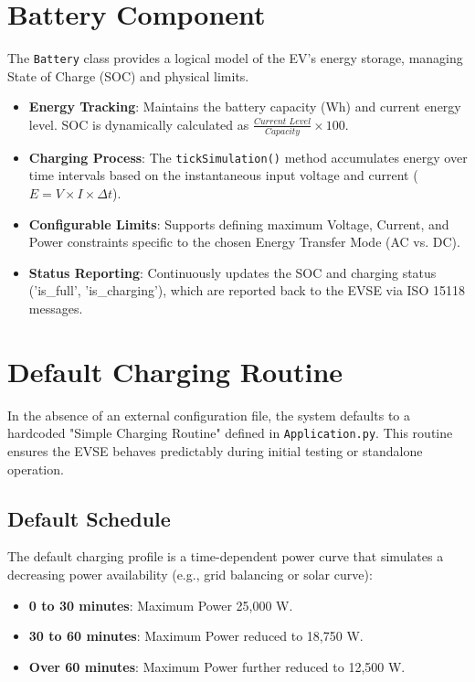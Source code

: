 \documentclass[a4paper,11pt]{report}
\begin{document}
\section{Battery Component}
The \texttt{Battery} class provides a logical model of the EV's energy storage, managing State of Charge (SOC) and physical limits.
\begin{itemize}
    \item \textbf{Energy Tracking}: Maintains the battery capacity (Wh) and current energy level. SOC is dynamically calculated as $\frac{\textit{Current Level}}{\textit{Capacity}} \times 100$.
    \item \textbf{Charging Process}: The \texttt{tickSimulation()} method accumulates energy over time intervals based on the instantaneous input voltage and current ($E = V \times I \times \Delta t$).
    \item \textbf{Configurable Limits}: Supports defining maximum Voltage, Current, and Power constraints specific to the chosen Energy Transfer Mode (AC vs. DC).
    \item \textbf{Status Reporting}: Continuously updates the SOC and charging status ('is\_full', 'is\_charging'), which are reported back to the EVSE via ISO 15118 messages.
\end{itemize}

\section{Default Charging Routine}
In the absence of an external configuration file, the system defaults to a hardcoded "Simple Charging Routine" defined in \texttt{Application.py}. This routine ensures the EVSE behaves predictably during initial testing or standalone operation.

\subsection{Default Schedule}
The default charging profile is a time-dependent power curve that simulates a decreasing power availability (e.g., grid balancing or solar curve):
\begin{itemize}
    \item \textbf{0 to 30 minutes}: Maximum Power 25,000 W.
    \item \textbf{30 to 60 minutes}: Maximum Power reduced to 18,750 W.
    \item \textbf{Over 60 minutes}: Maximum Power further reduced to 12,500 W.
\end{itemize}
\end{document}
